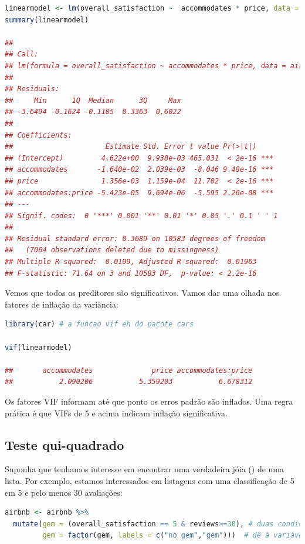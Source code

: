 \documentclass{article}
\begin{document}
\begin{lstlisting}[language=R]
linearmodel <- lm(overall_satisfaction ~  accommodates * price, data = airbnb)
summary(linearmodel)

## 
## Call:
## lm(formula = overall_satisfaction ~ accommodates * price, data = airbnb)
## 
## Residuals:
##     Min      1Q  Median      3Q     Max 
## -3.6494 -0.1624 -0.1105  0.3363  0.6022 
## 
## Coefficients:
##                      Estimate Std. Error t value Pr(>|t|)    
## (Intercept)         4.622e+00  9.938e-03 465.031  < 2e-16 ***
## accommodates       -1.640e-02  2.039e-03  -8.046 9.48e-16 ***
## price               1.356e-03  1.159e-04  11.702  < 2e-16 ***
## accommodates:price -5.423e-05  9.694e-06  -5.595 2.26e-08 ***
## ---
## Signif. codes:  0 '***' 0.001 '**' 0.01 '*' 0.05 '.' 0.1 ' ' 1
## 
## Residual standard error: 0.3689 on 10583 degrees of freedom
##   (7064 observations deleted due to missingness)
## Multiple R-squared:  0.0199, Adjusted R-squared:  0.01963 
## F-statistic: 71.64 on 3 and 10583 DF,  p-value: < 2.2e-16
\end{lstlisting}

Vemos que todos os preditores são significativos. Vamos dar uma olhada nos fatores de inflação da variância:

\begin{lstlisting}[language=R]
library(car) # a funcao vif eh do pacote cars

vif(linearmodel)

##       accommodates              price accommodates:price 
##           2.090206           5.359203           6.678312
\end{lstlisting}

Os fatores VIF informam até que ponto os erros padrão são inflados. Uma regra prática é que VIFs de 5 e acima indicam inflação significativa.

\subsection{Teste qui-quadrado}

Suponha que tenhamos interesse em encontrar uma verdadeira jóia () de uma lista. Por exemplo, estamos interessados em listagens com uma classificação de 5 em 5 e pelo menos 30 avaliações:

\begin{lstlisting}[language=R]
airbnb <- airbnb %>% 
  mutate(gem = (overall_satisfaction == 5 & reviews>=30), # duas condicoes devem ser atendidas antes de dizer que uma listagem eh uma joia
         gem = factor(gem, labels = c("no gem","gem")))  # dê à variável lógica rótulos mais intuitivos
\end{lstlisting}
\end{document}
